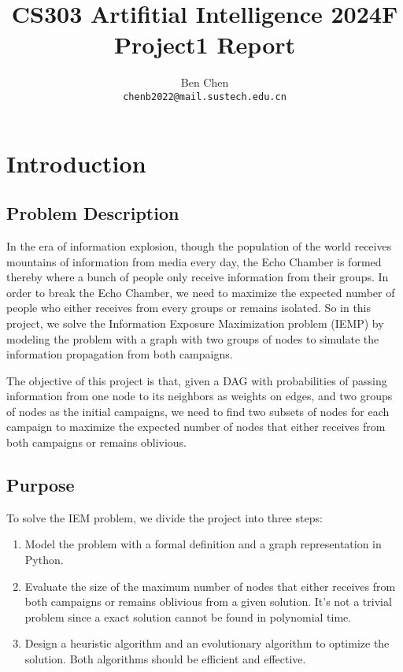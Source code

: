 \documentclass{article}
\title{\textbf{CS303 Artifitial Intelligence 2024F Project1 Report}}
\author{Ben Chen \\ \texttt{chenb2022@mail.sustech.edu.cn}}
\begin{document}
\maketitle

\section{Introduction}

\subsection{Problem Description}

In the era of information explosion, though the population of the world receives mountains of information from media every day, the Echo Chamber is formed thereby where a bunch of people only receive information from their groups. In order to break the Echo Chamber, we need to maximize the expected number of people who either receives from every groups or remains isolated. So in this project, we solve the Information Exposure Maximization problem (IEMP) by modeling the problem with a graph with two groups of nodes to simulate the information propagation from both campaigns.

The objective of this project is that, given a DAG with probabilities of passing information from one node to its neighbors as weights on edges, and two groups of nodes as the initial campaigns, we need to find two subsets of nodes for each campaign to maximize the expected number of nodes that either receives from both campaigns or remains oblivious.

\subsection{Purpose}

To solve the IEM problem, we divide the project into three steps:
\begin{enumerate}
    \item Model the problem with a formal definition and a graph representation in Python.
    \item Evaluate the size of the maximum number of nodes that either receives from both campaigns or remains oblivious from a given solution. It's not a trivial problem since a exact solution cannot be found in polynomial time.
    \item Design a heuristic algorithm and an evolutionary algorithm to optimize the solution. Both algorithms should be efficient and effective.
\end{enumerate}
\end{document}
